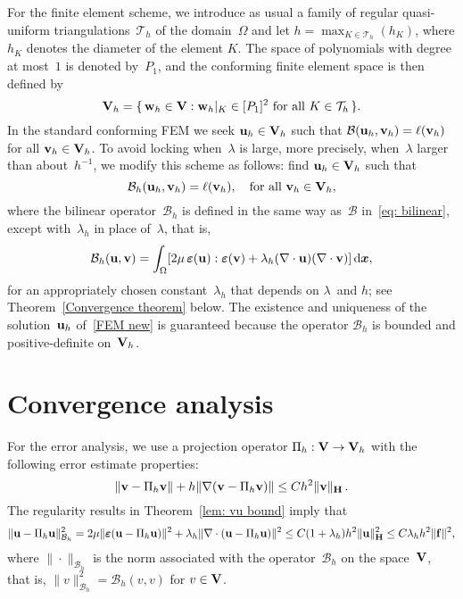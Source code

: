 \documentclass[11pt]{article}
\newcommand{\calB}{\mathcal{B}}
\newcommand{\vf}{{\bf f}}
\newcommand{\vu}{{\bf u}}
\newcommand{\vv}{{\bf v}}
\newcommand{\vV}{{\bf V}}
\newcommand{\vw}{{\bf w}}
\newcommand{\bsx}{{\boldsymbol{x}}}
\numberwithin{equation}{section}
\newcommand{\veps}{{\boldsymbol{\varepsilon}}}
\newcommand{\ud}{\mathrm{d}}
\begin{document}
For the finite element scheme, we introduce as usual a family of regular 
quasi-uniform triangulations~$\mathcal{T}_h$ of the domain~$\Omega$ and let 
$h=\max_{K\in \mathcal{T}_h}(h_K)$, where $h_{K}$ denotes the diameter of 
the element $K$.  The space of polynomials with degree at most~$1$ is denoted  by~$P_1$, and the conforming finite element space is then defined by 
\[\vV_h=\{\,\vw_h \in {\bf V}:\text{$\vw_h |_K \in [P_1]^2$ for all $K \in \mathcal{T}_h$}\,\}.
\]
In the standard conforming FEM we seek $\vu_h \in  \vV_h$ such that
$\calB(\vu_h, \vv_h) = \ell(\vv_h)$ for all $\vv_h \in  \vV_h$. To
avoid locking when~$\lambda$ is large, more precisely,
when~$\lambda$ larger than about~$h^{-1}$, we modify this scheme as
follows: find $\vu_h \in  \vV_h$ such that
\begin{equation}\label{FEM new}
\calB_h(\vu_h,\vv_h)=\ell(\vv_h),\quad\text{for all $\vv_h\in\vV_h$},
\end{equation}
where the bilinear operator~$\calB_h$ is defined in the same way as~$\calB$
in~\eqref{eq: bilinear}, except with~$\lambda_h$ in place of~$\lambda$,
that is,
\begin{equation*}
\calB_h(\vu,\vv)=\int_\Omega[2\mu\,\veps(\vu):\veps(\vv)
    +\lambda_h(\nabla\cdot\vu)(\nabla\cdot\vv)]\,\ud\bsx,
\end{equation*} 
for an appropriately chosen constant~$\lambda_h$ that depends on $\lambda$~and
$h$; see Theorem~\ref{Convergence theorem} below. The existence and uniqueness
of the solution~$\vu_h$ of~\eqref{FEM new} is guaranteed because the
operator $\calB_h$ is bounded and positive-definite on~$\vV_h$.

\section{Convergence analysis}\label{ConvAna}
For the error analysis, we use a projection operator $\Pi_h: \vV \to \vV_h$ with
the following error estimate properties:
\begin{equation}
    \label{projection estimate}\|\vv-\Pi_h \vv\|+h\|\nabla (\vv-\Pi_h \vv)\| \le C h^2 \|\vv\|_{\bf H}\,.
    \end{equation}
The regularity results in Theorem~\ref{lem: vu bound} imply that
\begin{equation}\label{projection estimate Bh}
\|\vu-\Pi_h \vu\|_{\calB_h}^2=2\mu\|\veps(\vu-\Pi_h \vu)\|^2
     +\lambda_h\|\nabla \cdot (\vu-\Pi_h \vu)\|^2
     \le C(1+\lambda_h) h^2 \|\vu\|_{\bf H}^2
      \le  C\lambda_h h^2 \|\vf\|^2,
\end{equation}
where $\|\cdot\|_{\calB_h}$ is the norm associated with the operator~$\calB_h$
on the space~$\vV$, that is, $\|v\|_{\calB_h}^2=\calB_h(v,v)$ for $v\in\vV$.
\end{document}
